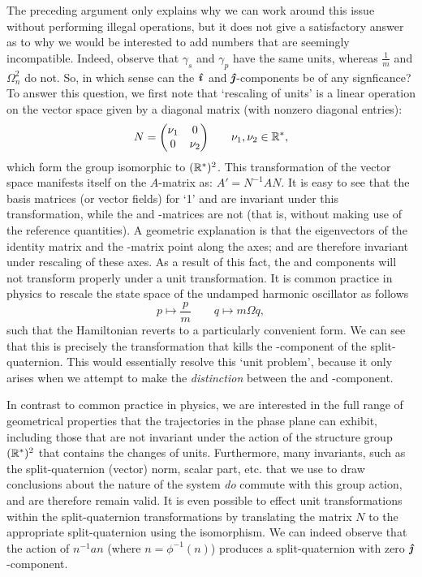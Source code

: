 The preceding argument only explains why we can work around this issue without performing illegal operations, but it does not give a satisfactory answer as to why we would be interested to add numbers that are seemingly incompatible. Indeed, observe that $\gamma_s$ and $\gamma_p$ have the same units, whereas $\tfrac{1}{m}$ and $\Omega_n^2$ do not. So, in which sense can the $\quati$ and $\quatj$-components be of any signficance? To answer this question, we first note that `rescaling of units' is a linear operation on the vector space given by a diagonal matrix (with nonzero diagonal entries): 
$$ N = \mqty(\dmat[0]{\nu_1}{\nu_2}) \qquad \nu_1, \nu_2 \in \real^*, $$
which form the group isomorphic to $(\real^*)^2$. This transformation of the vector space manifests itself on the $A$-matrix as: $ A' = N^{-1}A N$. It is easy to see that the basis matrices (or vector fields) for `1' and \quatk are invariant under this transformation, while the \quati and \quatj-matrices are not (that is, without making use of the reference quantities). A geometric explanation is that the eigenvectors of the identity matrix and the \quatk-matrix point along the axes; and are therefore invariant under rescaling of these axes. As a result of this fact, the \quati and \quatj components will not transform properly under a unit transformation. It is common practice in physics to rescale the state space of the undamped harmonic oscillator as follows \cite{Dekker1981,Dedene1980}
$$ p \mapsto \frac{p}{m} \qquad q \mapsto m\Omega q, $$
such that the Hamiltonian reverts to a particularly convenient form. We can see that this is precisely the transformation that kills the \quatj-component of the split-quaternion. This would essentially resolve this `unit problem', because it only arises when we attempt to make the \emph{distinction} between the \quati and \quatj-component.

In contrast to common practice in physics, we are interested in the full range of geometrical properties that the trajectories in the phase plane can exhibit, including those that are not invariant under the action of the structure group $(\real^*)^2$ that contains the changes of units. Furthermore, many invariants, such as the split-quaternion (vector) norm, scalar part, etc. that we use to draw conclusions about the nature of the system \emph{do} commute with this group action, and are therefore remain valid. It is even possible to effect unit transformations within the split-quaternion transformations by translating the matrix $N$ to the appropriate split-quaternion using the isomorphism. We can indeed observe that the action of $n^{-1} a n$ (where $n = \phi^{-1}(n)$) produces a split-quaternion with zero $\quatj$-component. 

